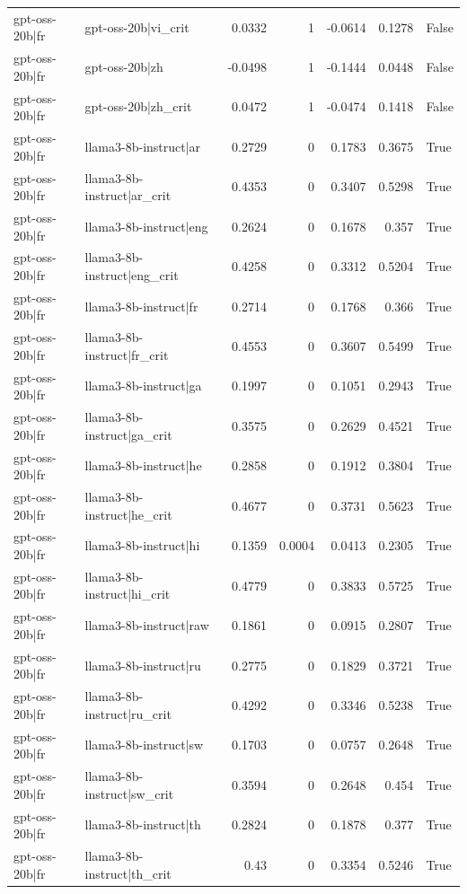 \begin{table}
\begin{tabular}{l l r r r r l}
gpt-oss-20b|fr & gpt-oss-20b|vi_crit & 0.0332 & 1 & -0.0614 & 0.1278 & False \\
gpt-oss-20b|fr & gpt-oss-20b|zh & -0.0498 & 1 & -0.1444 & 0.0448 & False \\
gpt-oss-20b|fr & gpt-oss-20b|zh_crit & 0.0472 & 1 & -0.0474 & 0.1418 & False \\
gpt-oss-20b|fr & llama3-8b-instruct|ar & 0.2729 & 0 & 0.1783 & 0.3675 & True \\
gpt-oss-20b|fr & llama3-8b-instruct|ar_crit & 0.4353 & 0 & 0.3407 & 0.5298 & True \\
gpt-oss-20b|fr & llama3-8b-instruct|eng & 0.2624 & 0 & 0.1678 & 0.357 & True \\
gpt-oss-20b|fr & llama3-8b-instruct|eng_crit & 0.4258 & 0 & 0.3312 & 0.5204 & True \\
gpt-oss-20b|fr & llama3-8b-instruct|fr & 0.2714 & 0 & 0.1768 & 0.366 & True \\
gpt-oss-20b|fr & llama3-8b-instruct|fr_crit & 0.4553 & 0 & 0.3607 & 0.5499 & True \\
gpt-oss-20b|fr & llama3-8b-instruct|ga & 0.1997 & 0 & 0.1051 & 0.2943 & True \\
gpt-oss-20b|fr & llama3-8b-instruct|ga_crit & 0.3575 & 0 & 0.2629 & 0.4521 & True \\
gpt-oss-20b|fr & llama3-8b-instruct|he & 0.2858 & 0 & 0.1912 & 0.3804 & True \\
gpt-oss-20b|fr & llama3-8b-instruct|he_crit & 0.4677 & 0 & 0.3731 & 0.5623 & True \\
gpt-oss-20b|fr & llama3-8b-instruct|hi & 0.1359 & 0.0004 & 0.0413 & 0.2305 & True \\
gpt-oss-20b|fr & llama3-8b-instruct|hi_crit & 0.4779 & 0 & 0.3833 & 0.5725 & True \\
gpt-oss-20b|fr & llama3-8b-instruct|raw & 0.1861 & 0 & 0.0915 & 0.2807 & True \\
gpt-oss-20b|fr & llama3-8b-instruct|ru & 0.2775 & 0 & 0.1829 & 0.3721 & True \\
gpt-oss-20b|fr & llama3-8b-instruct|ru_crit & 0.4292 & 0 & 0.3346 & 0.5238 & True \\
gpt-oss-20b|fr & llama3-8b-instruct|sw & 0.1703 & 0 & 0.0757 & 0.2648 & True \\
gpt-oss-20b|fr & llama3-8b-instruct|sw_crit & 0.3594 & 0 & 0.2648 & 0.454 & True \\
gpt-oss-20b|fr & llama3-8b-instruct|th & 0.2824 & 0 & 0.1878 & 0.377 & True \\
gpt-oss-20b|fr & llama3-8b-instruct|th_crit & 0.43 & 0 & 0.3354 & 0.5246 & True \\

\end{tabular}
\end{table}

